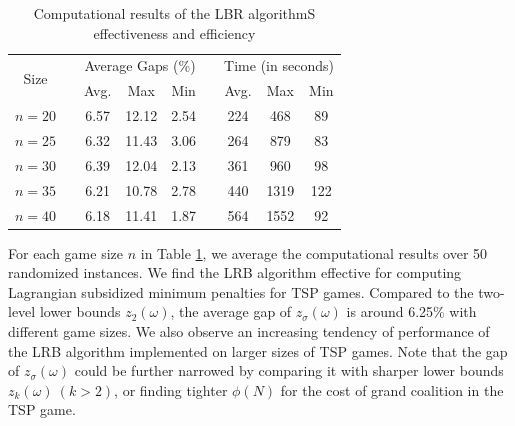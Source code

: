 \documentclass[authoryear,review,12pt]{elsarticle}
\begin{document}
\begin{table}[H]
\centering
\tabcolsep=17pt
\renewcommand\arraystretch{1.0}
\caption{\label{table:detailed20}Computational results of the LBR algorithmS effectiveness and efficiency}
\begin{tabular}[!h]{c c c c c c c c c}
\hline
\multirow{2}{*}{Size}  &\multicolumn{1}{c}{} &\multicolumn{3}{c}{Average Gaps (\%)}	&\multicolumn{1}{c}{} & \multicolumn{3}{c}{Time (in seconds)}\\
\cline{3-5}
\cline{7-9}
&	&Avg.	&Max	&Min	&	&Avg.	&Max	&Min\\
\hline
$n=20$	&	&6.57	&12.12	&2.54	&	&224	&468	&89\\

$n=25$	&	&6.32	&11.43	&3.06	&	&264	&879	&83\\

$n=30$	&	&6.39	&12.04	&2.13	&	&361	&960	&98\\

$n=35$	&	&6.21	&10.78	&2.78	&	&440	&1319	&122\\

$n=40$	&	&6.18	&11.41	&1.87	&	&564	&1552	&92\\
\hline
\end{tabular}
\end{table}
For each game size $n$ in Table \ref{table:detailed20}, we average the computational results over 50 randomized instances.
We find the LRB algorithm effective for computing Lagrangian subsidized minimum penalties for TSP games.
Compared to the two-level lower bounds $z_2(\omega)$, the average gap of $z_{\sigma}(\omega)$ is around 6.25\% with different game sizes.
We also observe an increasing tendency of performance of the LRB algorithm implemented on larger sizes of TSP games.
Note that the gap of $z_{\sigma}(\omega)$ could be further narrowed by comparing it with sharper lower bounds $z_k(\omega)~(k >2)$, or finding tighter $\phi(N)$ for the cost of grand coalition in the TSP game.
\end{document}
